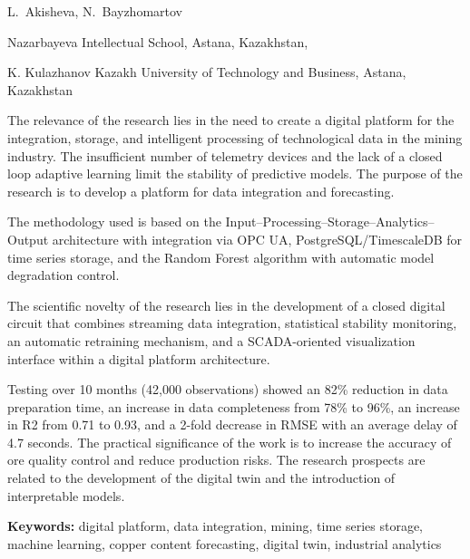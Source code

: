 
\begin{header}

L.~Akisheva\envelope,
N.~Bayzhomartov
\end{header}

\begin{affil}
Nazarbayeva Intellectual School, Astana, Kazakhstan,

K. Kulazhanov Kazakh University of Technology and Business, Astana, Kazakhstan

\end{affil}

The relevance of the research lies in the need to create a digital
platform for the integration, storage, and intelligent processing of
technological data in the mining industry. The insufficient number of
telemetry devices and the lack of a closed loop adaptive learning limit
the stability of predictive models. The purpose of the research is to
develop a platform for data integration and forecasting.

The methodology used is based on the
Input--Processing--Storage--Analytics--Output architecture with
integration via OPC UA, PostgreSQL/TimescaleDB for time series storage,
and the Random Forest algo\-rithm with automatic model degradation
control.

The scientific novelty of the research lies in the development of a
closed digital circuit that combines streaming data integration,
statistical stability monitoring, an automatic retraining mechanism, and
a SCADA-oriented visualization interface within a digital platform
architecture.

Testing over 10 months (42,000 observations) showed an 82\% reduction in
data preparation time, an increase in data completeness from 78\% to
96\%, an increase in R2 from 0.71 to 0.93, and a 2-fold decrease in RMSE
with an average delay of 4.7 seconds. The practical significance of the
work is to increase the accuracy of ore quality control and reduce
production risks. The research prospects are related to the development
of the digital twin and the introduction of interpretable models.

{\bfseries Keywords:} digital platform, data integration, mining, time series
storage, machine learning, copper content forecasting, digital twin,
industrial analytics

